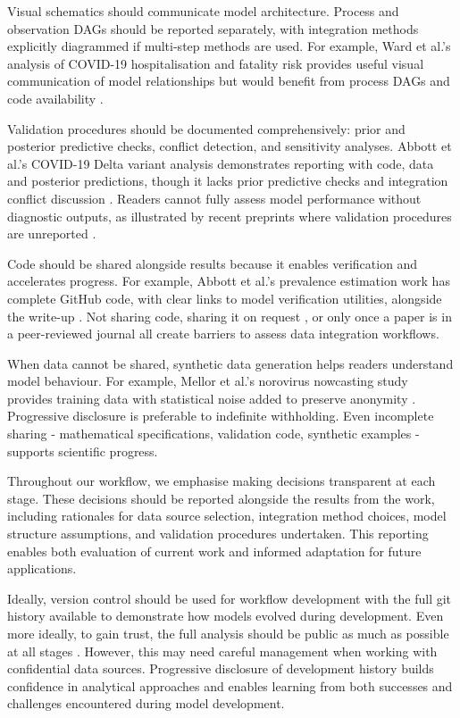 \documentclass{article}
\begin{document}
Visual schematics should communicate model architecture.
Process and observation DAGs should be reported separately, with integration methods explicitly diagrammed if multi-step methods are used.
For example, Ward et al.'s analysis of COVID-19 hospitalisation and fatality risk provides useful visual communication of model relationships but would benefit from process DAGs and code availability \citep{Ward2024-sp}.

Validation procedures should be documented comprehensively: prior and posterior predictive checks, conflict detection, and sensitivity analyses.
Abbott et al.'s COVID-19 Delta variant analysis demonstrates reporting with code, data and posterior predictions, though it lacks prior predictive checks and integration conflict discussion \citep{Abbott2021-delta}.
Readers cannot fully assess model performance without diagnostic outputs, as illustrated by recent preprints where validation procedures are unreported \citep{Fyles2024-qz}.

Code should be shared alongside results because it enables verification and accelerates progress.
For example, Abbott et al.'s prevalence estimation work has complete GitHub code, with clear links to model verification utilities, alongside the write-up \citep{Abbott2022-prevalence}.
Not sharing code, sharing it on request \citep{Ward2024-sp}, or only once a paper is in a peer-reviewed journal \citep{Fyles2024-qz} all create barriers to assess data integration workflows.

When data cannot be shared, synthetic data generation helps readers understand model behaviour.
For example, Mellor et al.'s norovirus nowcasting study provides training data with statistical noise added to preserve anonymity \citep{Mellor2025-noroviru}.
Progressive disclosure is preferable to indefinite withholding.
Even incomplete sharing - mathematical specifications, validation code, synthetic examples - supports scientific progress.

Throughout our workflow, we emphasise making decisions transparent at each stage.
These decisions should be reported alongside the results from the work, including rationales for data source selection, integration method choices, model structure assumptions, and validation procedures undertaken.
This reporting enables both evaluation of current work and informed adaptation for future applications.

Ideally, version control should be used for workflow development with the full git history available to demonstrate how models evolved during development.
Even more ideally, to gain trust, the full analysis should be public as much as possible at all stages \citep{Abbott2021-delta, Abbott2022-prevalence}.
However, this may need careful management when working with confidential data sources.
Progressive disclosure of development history builds confidence in analytical approaches and enables learning from both successes and challenges encountered during model development.
\end{document}
